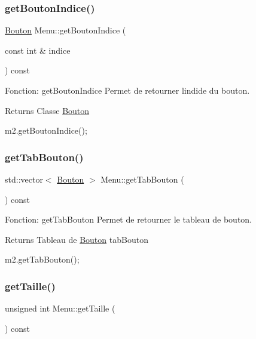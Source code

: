 \subsubsection{\texorpdfstring{get\+Bouton\+Indice()}{getBoutonIndice()}}
{\footnotesize\ttfamily \hyperlink{classBouton}{Bouton} Menu\+::get\+Bouton\+Indice (\begin{DoxyParamCaption}\item[{const int \&}]{indice }\end{DoxyParamCaption}) const}



Fonction\+: get\+Bouton\+Indice Permet de retourner l\textquotesingle{}indide du bouton. 

\begin{DoxyReturn}{Returns}
Classe \hyperlink{classBouton}{Bouton} 
\begin{DoxyCode}
m2.getBoutonIndice();
\end{DoxyCode}
 
\end{DoxyReturn}
\mbox{\label{classMenu_a5614b2f97741d2d71177f40b49151bc8}} 
\subsubsection{\texorpdfstring{get\+Tab\+Bouton()}{getTabBouton()}}
{\footnotesize\ttfamily std\+::vector$<$ \hyperlink{classBouton}{Bouton} $>$ Menu\+::get\+Tab\+Bouton (\begin{DoxyParamCaption}{ }\end{DoxyParamCaption}) const}



Fonction\+: get\+Tab\+Bouton Permet de retourner le tableau de bouton. 

\begin{DoxyReturn}{Returns}
Tableau de \hyperlink{classBouton}{Bouton} tab\+Bouton 
\begin{DoxyCode}
m2.getTabBouton();
\end{DoxyCode}
 
\end{DoxyReturn}
\mbox{\label{classMenu_a18df56bedec00d9a6a79ae1625c67329}} 
\subsubsection{\texorpdfstring{get\+Taille()}{getTaille()}}
{\footnotesize\ttfamily unsigned int Menu\+::get\+Taille (\begin{DoxyParamCaption}{ }\end{DoxyParamCaption}) const}



